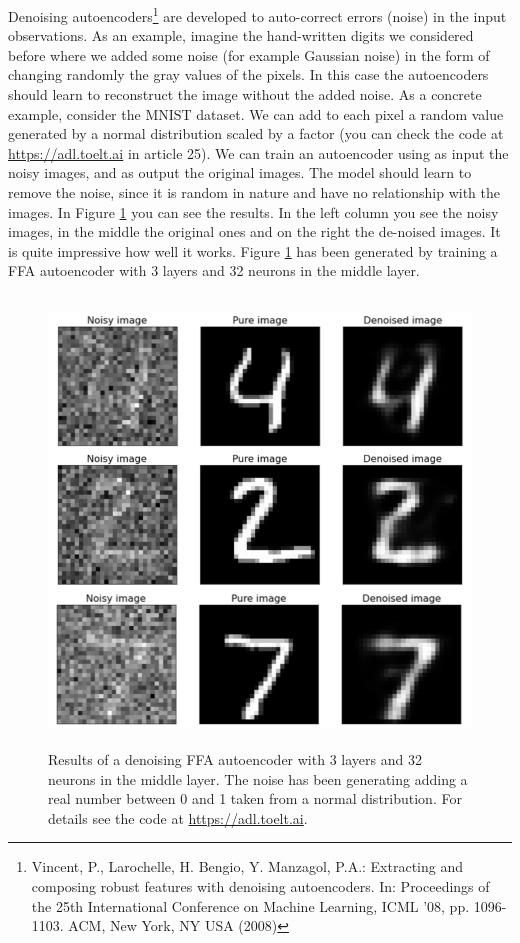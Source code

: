 \documentclass[12pt,a4]{article}
\begin{document}
Denoising autoencoders\footnote{ Vincent, P., Larochelle, H. Bengio, Y. Manzagol, P.A.: Extracting and composing robust features with denoising autoencoders. In: Proceedings of the 25th International Conference on Machine Learning, ICML ’08, pp. 1096-1103. ACM, New York, NY USA (2008)} are developed to auto-correct errors (noise) in the input observations. As an example, imagine the hand-written digits we considered before where we added some noise (for example Gaussian noise) in the form of changing randomly the gray values of the pixels. In this case the autoencoders should learn to reconstruct the image without the added noise. As a concrete example, consider the MNIST dataset. We can add to each pixel a random value generated by a normal distribution scaled by a factor (you can check the code at \url{https://adl.toelt.ai} in article 25). We can train an autoencoder using as input the noisy images, and as output the original images. The model should learn to remove the noise, since it is random in nature and have no relationship with the images. 
In Figure \ref{fig:recon5} you can see the results. In the left column you see the noisy images, in the middle the original ones and on the right the de-noised images. It is quite impressive how well it works. Figure \ref{fig:recon5} has been generated by training a FFA autoencoder with 3 layers and 32 neurons in the middle layer.
\begin{figure}[hbt]
\centering
\includegraphics[width=12.16cm,height=11.92cm]{./images/image14.png}
\caption{Results of a denoising FFA autoencoder with 3 layers and 32 neurons in the middle layer. The noise has been generating adding a real number between 0 and 1 taken from a normal distribution. For details see the code at \url{https://adl.toelt.ai}.}\label{fig:recon5}
\end{figure}
\end{document}
